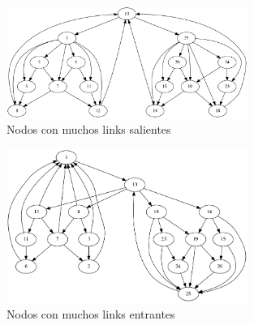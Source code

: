 \begin{figure}[H]
	\centering
	\includegraphics[width=0.7\textwidth]{img/links_salientes_25.png}
	\caption{Nodos con muchos links salientes}
	\label{fig:Ranking nodos con muchos links salientes}
\end{figure}



\begin{figure}[H]
	\centering
	\includegraphics[width=0.7\textwidth]{img/links_entrantes_25.png}
	\caption{Nodos con muchos links entrantes}
	\label{fig:Ranking nodos con muchos links entrantes}
\end{figure}
